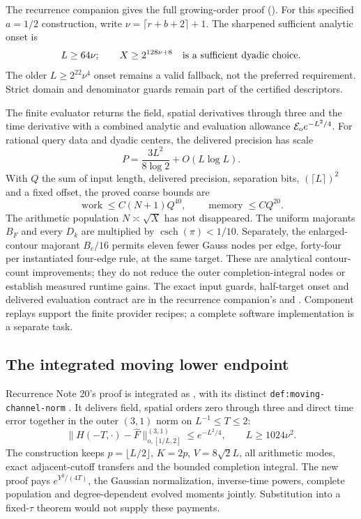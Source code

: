 The recurrence companion gives the full growing-order proof
().
For this specified $a=1/2$ construction, write
$\nu=\lceil r+b+2\rceil+1$. The sharpened sufficient analytic onset is
\begin{equation}
 L\ge64\nu;
 \qquad X\ge2^{128\nu+8}\quad\hbox{is a sufficient dyadic choice}.
 \label{eq:rec-onset}
\end{equation}
The older $L\ge2^{22}\nu^4$ onset remains a valid fallback, not the
preferred requirement. Strict domain and denominator guards remain
part of the certified descriptors.

The finite evaluator returns the field, spatial derivatives through
three and the time derivative with a combined analytic and evaluation
allowance $\mathcal E_{\mathrm o} e^{-L^2/4}$. For rational query data and dyadic centers,
the delivered precision has scale
\[
 P=\frac{3L^2}{8\log2}+O(L\log L).
\]
With $Q$ the sum of input length, delivered precision, separation bits,
$(\lceil L\rceil)^2$ and a fixed offset, the proved coarse bounds are
\begin{equation}
 \operatorname{work}\le C(N+1)Q^{40},\qquad
 \operatorname{memory}\le C Q^{20}.
 \label{eq:negative-complexity}
\end{equation}
The arithmetic population $N\asymp\sqrt X$ has not disappeared.
The uniform majorants $B_F$ and every $D_k$ are multiplied by
$\operatorname{csch}(\pi)<1/10$. Separately, the enlarged-contour
majorant $B_c/16$ permits eleven fewer Gauss nodes per edge,
forty-four per instantiated four-edge rule, at the same target.
These are analytical contour-count improvements; they do not reduce
the outer completion-integral nodes or establish measured runtime gains.
The exact input guards, half-target onset and delivered evaluation contract
are in the recurrence companion's
and . Component replays support the finite provider recipes;
a complete software implementation is a separate task.

\subsection{The integrated moving lower endpoint}
Recurrence Note 20's proof is integrated as
,
with its distinct \texttt{def:moving-channel-norm} \cite{rec-moving}.
It delivers field, spatial orders zero through three and direct time
error together in the outer $(3,1)$ norm on $L^{-1}\le T\le2$:
\[
 \|H(-T,\cdot)-\widehat F\|_{\mathrm o,[1/L,2]}^{(3,1)}
 \le e^{-L^2/4},\qquad L\ge1024\nu^2.
\]
The construction keeps $p=\lfloor L/2\rfloor$, $K=2p$,
$V=8\sqrt2L$, all arithmetic modes, exact adjacent-cutoff transfers
and the bounded completion integral. The new proof pays
$e^{Y^2/(4T)}$, the Gaussian normalization, inverse-time powers,
complete population and degree-dependent evolved moments jointly.
Substitution into a fixed-$\tau$ theorem would not supply these payments.

